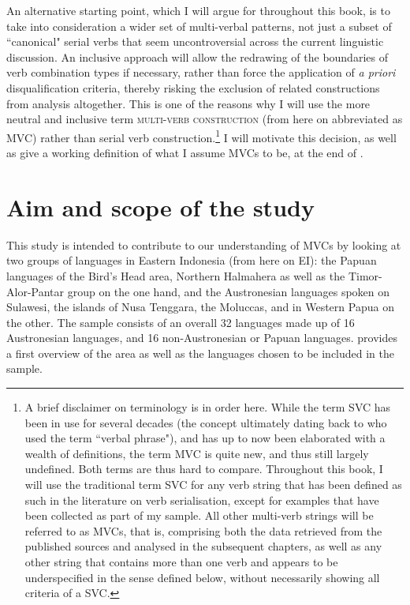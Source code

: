 An alternative starting point, which I will argue for throughout this book, is to take into consideration a wider set of multi-verbal patterns, not just a subset of ``canonical" serial verbs that seem uncontroversial across the current linguistic discussion. An inclusive approach will allow the redrawing of the boundaries of verb combination types if necessary, rather than force the application of \textit{a priori} disqualification criteria, thereby risking the exclusion of related constructions from analysis altogether. This is one of the reasons why I will use the more neutral and inclusive term \textsc{multi-verb construction} (from here on abbreviated as MVC) rather than serial verb construction.\footnote{A brief disclaimer on terminology is in order here. While the term SVC has been in use for several decades (the concept ultimately dating back to \citealt{christaller1875} who used the term ``verbal phrase"), and has up to now been elaborated with a wealth of definitions, the term MVC is quite new, and thus still largely undefined. Both terms are thus hard to compare. Throughout this book, I will use the traditional term SVC for any verb string that has been defined as such in the literature on verb serialisation, except for examples that have been collected as part of my sample. All other multi-verb strings will be referred to as MVCs, that is, comprising both the data retrieved from the published sources and analysed in the subsequent chapters, as well as any other string that contains more than one verb and appears to be underspecified in the sense defined below, without necessarily showing all criteria of a SVC.} I will motivate this decision, as well as give a working definition of what I assume MVCs to be, at the end of .

\section{Aim and scope of the study}

This study is intended to contribute to our understanding of MVCs by looking at two groups of languages in Eastern Indonesia (from here on EI): the Papuan languages of the Bird's Head area, Northern Halmahera as well as the Timor-Alor-Pantar group on the one hand, and the Austronesian languages spoken on Sulawesi, the islands of Nusa Tenggara, the Moluccas, and in Western Papua on the other. The sample consists of an overall 32 languages made up of 16 Austronesian languages, and 16 non-Austronesian or Papuan languages.  provides a first overview of the area as well as the languages chosen to be included in the sample.

